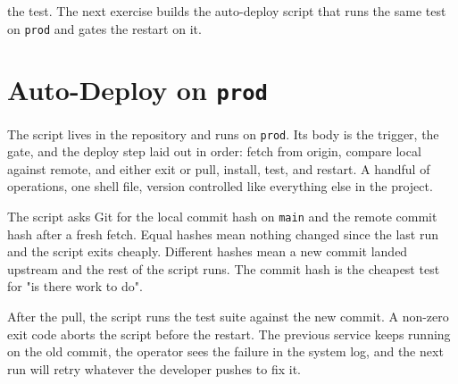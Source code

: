  the test.
The next exercise builds the auto-deploy script that runs the same
test on \texttt{prod} and gates the restart on it.







\newpage
\section{Auto-Deploy on \texttt{prod}}

The script lives in the repository and runs on \texttt{prod}.
Its body is the trigger, the gate, and the deploy step laid out in
order: fetch from origin, compare local against remote, and either
exit or pull, install, test, and restart.
A handful of operations, one shell file, version controlled like
everything else in the project.


The script asks Git for the local commit hash on \texttt{main} and
the remote commit hash after a fresh fetch.
Equal hashes mean nothing changed since the last run and the script
exits cheaply.
Different hashes mean a new commit landed upstream and the rest of
the script runs.
The commit hash is the cheapest test for "is there work to do".

After the pull, the script runs the test suite against the new commit.
A non-zero exit code aborts the script before the restart.
The previous service keeps running on the old commit, the operator
sees the failure in the system log, and the next run will retry
whatever the developer pushes to fix it.


